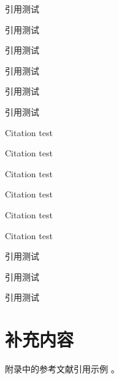 \documentclass[degree=doctor]{thuthesis}
\begin{document}
\START
\showoutput

引用\citet{zhangkun1994}测试\par
引用\citet[42]{zhangkun1994}测试\par
引用\citep{zhangkun1994}测试\par
引用\citep[42]{zhangkun1994}测试\par
引用\citep[见][]{zhukezhen1973}测试\par
引用\citep[见][42]{zhukezhen1973}测试\par

Citation \citet{dupont1974bone} test\par
Citation \citet[42]{dupont1974bone} test\par
Citation\citep{dupont1974bone} test\par
Citation\citep[42]{dupont1974bone} test\par
Citation \citep[see][]{zhengkaiqing1987} test\par
Citation \citep[see][42]{zhengkaiqing1987} test\par

引用\citep{zhangkun1994}测试\par
引用\citep{zhukezhen1973,dupont1974bone}测试\par
引用\citep{zhengkaiqing1987,jiangxizhou1980,jianduju1994}测试\par

\nocite{*}

\printbibliography


\appendix

\chapter{补充内容}

附录\cite{dupont1974bone}中的参考文献引用\cite{zhengkaiqing1987}示例
\cite{dupont1974bone,zhengkaiqing1987}。

\printbibliography

\clearpage
\OMIT
\end{document}

